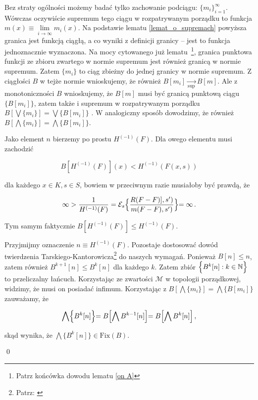 	Bez straty ogólności możemy badać tylko zachowanie podciągu:  $ \{m_i \}_{i=1}^{\infty}$. Wówczas oczywiście supremum tego ciągu w rozpatrywanym porządku to funkcja $m(x) \equiv \underset{i \rightarrow \infty}{\lim} m_i (x)$.	Na podstawie lematu \ref{lemat_o_supremach} powyższa granica jest funkcją ciągłą, a co wyniki z definicji granicy -- jest to funkcja jednoznacznie wyznaczona. Na mocy cytowanego już lematu~\footnote{Patrz końcówka dowodu lematu \ref{on A}}, granica punktowa funkcji ze zbioru zwartego w normie supremum jest również granicą w normie supremum. Zatem $\{ m_i \}$ to ciąg zbieżny do jednej granicy w normie supremum. Z ciągłości $B$ w tejże normie wnioskujemy, że również $B[m_i] \underset{\sup}{\rightarrow} B[m]$. Ale z monotoniczności $B$ wnioskujemy, że $B[m]$ musi być granicą punktową ciągu $\{ B[m_i]\}$, zatem także i supremum w rozpatrywanym porządku $B[\bigvee \{m_i\}] = \bigvee \{ B[m_i]\}$ . W analogiczny sposób dowodzimy, że również $B[\bigwedge \{m_i\}] = \bigwedge \{ B[m_i]\}$. 
		
		
	Jako element $n$ bierzemy po prostu $H^{(-1)}(F)$. Dla owego elementu musi zachodzić 

	$$B[H^{(-1)}(F)](x) < H^{(-1)}(F(x,s))$$

dla każdego $x \in K, s \in S$, bowiem w przeciwnym razie musiałoby być prawdą, że
	
$$ \infty > \frac{1}{H^{(-1)}(F)} = \mathcal{E}_s \Bigl \{ \frac{R(F-F)],s')}{m(F-F), s')}	\Bigl \} = \infty  \,.$$

Tym samym faktycznie $B[H^{(-1)}(F)] \leq H^{(-1)}(F)$. 

Przyjmijmy oznaczenie $n \equiv H^{(-1)}(F)$. Pozostaje dostosować dowód twierdzenia Tarskiego-Kantorowicza\footnote{Patrz: \citet[][str. 26]{Granas_FPT}} do naszych wymagań. Ponieważ $B[n] \leq n$, zatem również $B^{k+1}[n] \leq B^{k}[n]$ dla każdego $k$. Zatem zbiór $\Bigl \{ B^{k}[n] : k \in \mathbb{N} \Bigl \}$ to przeliczalny łańcuch. Korzystając ze zwartości $\mathcal{M}$ w topologii porządkowej, widzimy, że musi on posiadać infimum. Korzystając z $B[\bigwedge \{m_i\}] = \bigwedge \{ B[m_i]\}$ zauważamy, że

$$ \bigwedge \Bigl\{ B^{k}[n] \Bigl\} = B\Bigl[ \bigwedge B^{k-1}[n] \Bigl] =  B\Bigl[ \bigwedge B^{k}[n] \Bigl]\,,$$      

skąd wynika, że $\bigwedge \{ B^{k}[n]\} \in \mathrm{Fix}(B)$.  	

\qed
\newline


